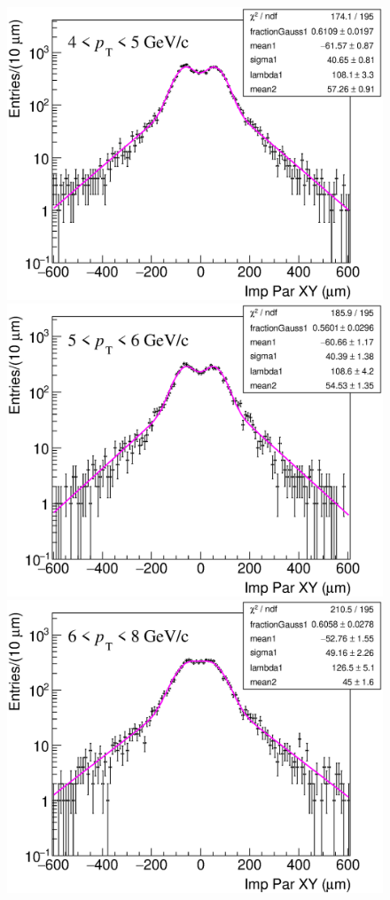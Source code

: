 \documentclass[b5paper,10pt,twoside,oldstyle,classica]{toptesi}
\begin{document}
\begin{figure}[h]
\begin{center}
{\includegraphics[scale = 0.24]{ImpParBkg_4-5.eps}}
\hspace{0cm}
{\includegraphics[scale = 0.24]{ImpParBkg_5-6.eps}}
\vspace{0cm}
{\includegraphics[scale = 0.24]{ImpParBkg_6-8.eps}}

\end{center}
\end{figure}
\end{document}
